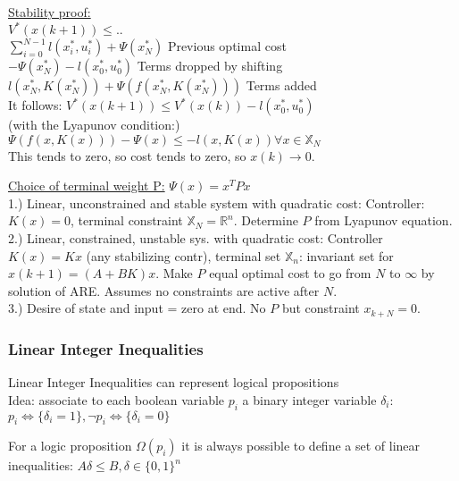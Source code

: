 \documentclass[10pt,parskip]{scrartcl}
\begin{document}
\begin{multicols*}{3}
\underline{Stability proof:}\\
\hspace*{2mm}$V^*(x(k+1)) \leq ..$\\
\hspace*{8mm}$\sum\nolimits_{i=0}^{N-1} l(x_i^*, u_i^*)+ \Psi(x_N^*)$ \hspace*{5mm} Previous optimal cost\\
\hspace*{8mm}$- \Psi(x_N^*) -  l(x_0^*, u_0^*)$ \hspace*{5mm} Terms dropped by shifting\\
\hspace*{8mm}$l(x_N^*, K(x_N^*)) + \Psi(f(x_N^*, K(x_N^*)))$\hspace*{5mm} Terms added\\
It follows: $V^*(x(k+1)) \leq V^*(x(k)) - l(x_0^*, u_0^*)$\\
 (with the Lyapunov condition:)\\
\hspace*{8mm}$\Psi(f(x,K(x)))-\Psi(x) \leq -l(x,K(x)) \forall x \in \mathbb X_N$\\
This tends to zero, so cost tends to zero, so $x(k) \rightarrow 0$.


\underline{Choice of terminal weight P:} $\Psi(x) = x^T P x$\\
1.) Linear, unconstrained and stable system with quadratic cost: Controller: $K(x) = 0$, terminal constraint $\mathbb X_N = \mathbb R^n$. Determine $P$ from Lyapunov equation. \\
2.) Linear, constrained, unstable sys. with quadratic cost: Controller $K(x) = Kx$ (any stabilizing contr), terminal set $\mathbb X_n$: invariant set for $x(k+1)=(A+BK)x$.  Make $P$ equal optimal cost to go from $N$ to $\infty$ by solution of ARE. Assumes no constraints are active after $N$.\\
3.) Desire of state and input = zero at end. No $P$ but constraint $x_{k+N}=0$. 

\subsubsection{Linear Integer Inequalities} Linear Integer Inequalities can represent logical propositions\\
Idea: associate to each boolean variable $p_i$ a binary integer variable $\delta_i$:
$p_i \Leftrightarrow\{\delta_i = 1\}, \neg p_i \Leftrightarrow\{\delta_i = 0\}$

For a logic proposition $\Omega(p_i)$ it is always possible to define a set of linear inequalities:
$A \delta \leq B, \delta \in \{0,1\}^n$



\end{multicols*}
\end{document}
